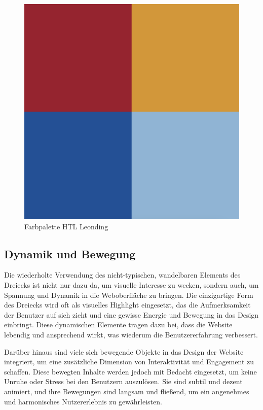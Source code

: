 \begin{figure}
   \begin{minipage}[b]{\linewidth} 
      \includegraphics[scale=0.3]{pics/Farbpalette.png}
      \caption{Farbpalette HTL Leonding}
      \label{fig:impl:Farbpalette}
   \end{minipage}
   \hspace{.05\linewidth}
\end{figure}

\subsection{Dynamik und Bewegung}
Die wiederholte Verwendung des nicht-typischen, wandelbaren Elements des Dreiecks ist nicht nur dazu da, um visuelle Interesse zu wecken, 
sondern auch, um Spannung und Dynamik in die Weboberfläche zu bringen. Die einzigartige Form des Dreiecks wird oft als visuelles Highlight 
eingesetzt, das die Aufmerksamkeit der Benutzer auf sich zieht und eine gewisse Energie und Bewegung in das Design einbringt. 
Diese dynamischen Elemente tragen dazu bei, dass die Website lebendig und ansprechend wirkt, was wiederum die Benutzererfahrung verbessert.

Darüber hinaus sind viele sich bewegende Objekte in das Design der Website integriert, um eine zusätzliche Dimension von Interaktivität 
und Engagement zu schaffen. Diese bewegten Inhalte werden jedoch mit Bedacht eingesetzt, um keine Unruhe oder Stress bei den Benutzern 
auszulösen. Sie sind subtil und dezent animiert, und ihre Bewegungen sind langsam und fließend, um ein angenehmes und harmonisches 
Nutzererlebnis zu gewährleisten.

